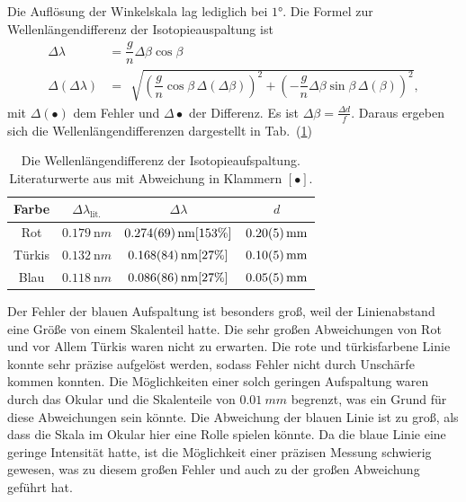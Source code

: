 \documentclass[sn-mathphys-num,iicol]{sn-jnl}
\theoremstyle{thmstyleone}
\theoremstyle{thmstyletwo}
\theoremstyle{thmstylethree}
\begin{document}
Die Auflösung der Winkelskala lag lediglich bei $\ang{1}$.
Die Formel zur Wellenlängendifferenz der Isotopieauspaltung ist
\begin{align} 
        \Delta \lambda &=\dfrac{g}{n}\Delta \beta \cos \beta\\
        \Delta \left(\Delta \lambda \right) &= \,\sqrt[]{\left(\dfrac{g}{n}\cos \beta \,\Delta \left(\Delta \beta \right)\right)^2+\left(-\dfrac{g}{n}\Delta \beta \sin \beta \,\Delta \left(\beta \right)\right)^2}
,\end{align} 
mit $\Delta \left(\bullet\right)$ dem Fehler und $\Delta \bullet $ der Differenz.
Es ist $\Delta \beta =\tfrac{\Delta d}{f}$.
Daraus ergeben sich die Wellenlängendifferenzen dargestellt in Tab.\ (\ref{tab:isotopie_okular})

\begin{table}[h]
        \begin{tabular}{cccc}
                Farbe & $\Delta \lambda _\text{lit.}$ & $\Delta \lambda $ &  $d$ \\
                \hline
                Rot & $\SI{0.179}{\nano m}$& $\SI{0.274+-0.069}{\nano m}[153\%]$  & $\SI{0.2+-0.05}{mm}$ \\
                Türkis& $\SI{0.132}{\nano m}$ & $\SI{0.168+-0.084}{\nano m}[27\%]$  & $\SI{0.1+-0.05}{mm}$ \\
                Blau & $\SI{0.118}{\nano m}$& $\SI{0.086+-0.086}{\nano m}[27\%]$  & $\SI{0.05+-0.05}{mm}$ 
        \end{tabular}
        \caption{Die Wellenlängendifferenz der Isotopieaufspaltung. Literaturwerte aus \cite{LeyboldBalmerserieBeobachtung} mit Abweichung in Klammern $[\bullet ]$.} \label{tab:isotopie_okular}
\end{table}
Der Fehler der blauen Aufspaltung ist besonders groß, weil der Linienabstand eine Größe von einem Skalenteil hatte.
Die sehr großen Abweichungen von Rot und vor Allem Türkis waren nicht zu erwarten.
Die rote und türkisfarbene Linie konnte sehr präzise aufgelöst werden, sodass Fehler nicht durch Unschärfe kommen konnten.
Die Möglichkeiten einer solch geringen Aufspaltung waren durch das Okular und die Skalenteile von $\SI{0.01}{mm}$ begrenzt, was ein Grund für diese Abweichungen sein könnte.
Die Abweichung der blauen Linie ist zu groß, als dass die Skala im Okular hier eine Rolle spielen könnte.
Da die blaue Linie eine geringe Intensität hatte, ist die Möglichkeit einer präzisen Messung schwierig gewesen, was zu diesem großen Fehler und auch zu der großen Abweichung geführt hat.
\end{document}
